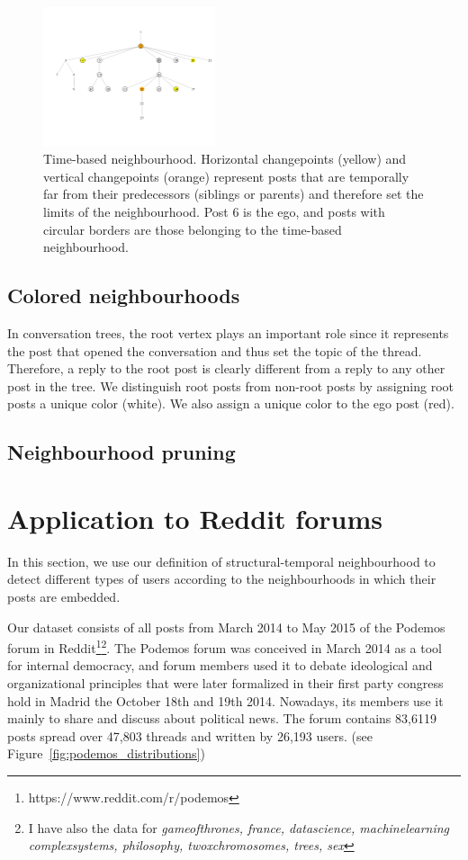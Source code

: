\documentclass[conference]{IEEEtran}
\begin{document}
\begin{figure}
\centering
\includegraphics[width=0.45\textwidth]{breakpoints}
\caption{Time-based neighbourhood. Horizontal changepoints (yellow) and vertical changepoints (orange) represent posts that are temporally far from their predecessors (siblings or parents) and therefore set the limits of the neighbourhood. Post 6 is the ego, and posts with circular borders are those belonging to the time-based neighbourhood.}
\label{fig:cutpoints}
\end{figure}

\subsection{Colored neighbourhoods}
In conversation trees, the root vertex plays an important role since it represents the post that opened the conversation and thus set the topic of the thread. Therefore, a reply to the root post is clearly different from a reply to any other post in the tree. We distinguish root posts from non-root posts by assigning root posts a unique color (white). We also assign a unique color to the ego post (red). 

\subsection{Neighbourhood pruning}\label{sec:pruning}


\section{Application to Reddit forums}
In this section, we use our definition of structural-temporal neighbourhood to detect different types of users according to the neighbourhoods in which their posts are embedded.

Our dataset consists of all posts from March 2014 to May 2015 of the Podemos forum in Reddit\footnote{https://www.reddit.com/r/podemos}\footnote{I have also the data for \textit{gameofthrones, france, datascience, machinelearning complexsystems, philosophy, twoxchromosomes, trees, sex}}. The Podemos forum was conceived in March 2014 as a tool for internal democracy, and forum members used it to debate ideological and organizational principles that were later formalized in their first party congress hold in Madrid the October 18th and 19th 2014. Nowadays, its members use it mainly to share and discuss about political news.
The forum contains 83,6119 posts spread over 47,803 threads and written by 26,193 users. (see Figure~\ref{fig:podemos_distributions})
\end{document}
